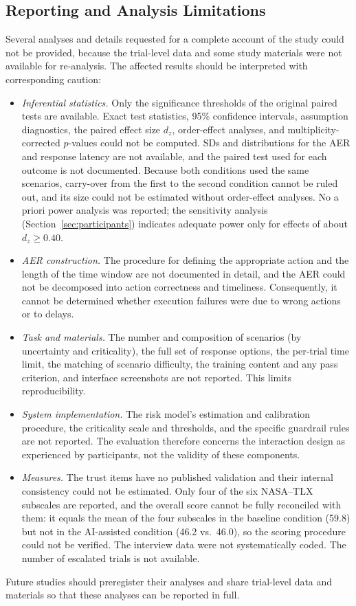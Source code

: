 \documentclass[journal]{IEEEtran}
\theoremstyle{plain}
\theoremstyle{definition}
\begin{document}
    \subsection{Reporting and Analysis Limitations}
    \label{sec:lim_reporting}
    Several analyses and details requested for a complete account of the study could not be provided, because the trial-level data and some study materials were not available for re-analysis. The affected results should be interpreted with corresponding caution:
    \begin{itemize}
        \item \emph{Inferential statistics.} Only the significance thresholds of the original paired tests are available. Exact test statistics, 95\% confidence intervals, assumption diagnostics, the paired effect size $d_z$, order-effect analyses, and multiplicity-corrected $p$-values could not be computed. SDs and distributions for the AER and response latency are not available, and the paired test used for each outcome is not documented. Because both conditions used the same scenarios, carry-over from the first to the second condition cannot be ruled out, and its size could not be estimated without order-effect analyses. No a priori power analysis was reported; the sensitivity analysis (Section~\ref{sec:participants}) indicates adequate power only for effects of about $d_z \geq 0.40$.
        \item \emph{AER construction.} The procedure for defining the appropriate action and the length of the time window are not documented in detail, and the AER could not be decomposed into action correctness and timeliness. Consequently, it cannot be determined whether execution failures were due to wrong actions or to delays.
        \item \emph{Task and materials.} The number and composition of scenarios (by uncertainty and criticality), the full set of response options, the per-trial time limit, the matching of scenario difficulty, the training content and any pass criterion, and interface screenshots are not reported. This limits reproducibility.
        \item \emph{System implementation.} The risk model's estimation and calibration procedure, the criticality scale and thresholds, and the specific guardrail rules are not reported. The evaluation therefore concerns the interaction design as experienced by participants, not the validity of these components.
        \item \emph{Measures.} The trust items have no published validation and their internal consistency could not be estimated. Only four of the six NASA--TLX subscales are reported, and the overall score cannot be fully reconciled with them: it equals the mean of the four subscales in the baseline condition (59.8) but not in the AI-assisted condition (46.2 vs.\ 46.0), so the scoring procedure could not be verified. The interview data were not systematically coded. The number of escalated trials is not available.
    \end{itemize}
    Future studies should preregister their analyses and share trial-level data and materials so that these analyses can be reported in full.
\end{document}
